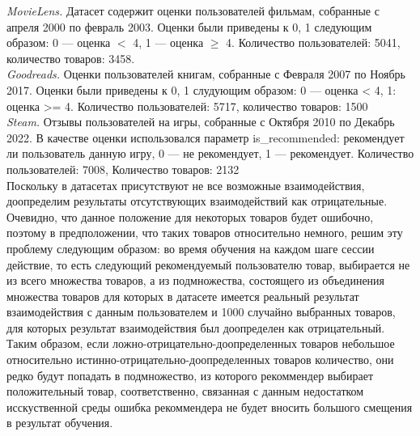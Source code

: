 \documentclass[a4paper,14pt,oneside]{mipt-thesis-ms}
\renewcommand{\geq}{\geqslant}  %
\begin{document}
{\it MovieLens\cite{movielens01}.} Датасет содержит оценки пользователей фильмам, собранные с апреля 2000 по февраль 2003. Оценки были приведены к {0, 1} следующим образом: 0 --- оценка $<$ 4, 1 --- оценка $\geq$ 4. Количество пользователей: 5041, количество товаров: 3458.\\

{\it Goodreads\cite{goodreads01}.} Оценки пользователей книгам, собранные с Февраля 2007 по
Ноябрь 2017. Оценки были приведены к {0, 1} слудующим образом: 0 --- оценка < 4, 1: оценка >= 4. Количество пользователей: 5717, количество товаров: 1500\\

{\it Steam\cite{steam01}.} Отзывы пользователей на игры, собранные с Октября 2010 по
Декабрь 2022. В качестве оценки использовался параметр is\_recommended: рекомендует ли пользователь данную игру, 0 --- не рекомендует, 1 --- рекомендует. Количество пользователей: 7008, Количество товаров: 2132\\

Поскольку в датасетах присутствуют не все возможные взаимодействия, доопределим результаты отсутствующих взаимодействий как отрицательные. Очевидно, что данное положение для некоторых товаров будет ошибочно, поэтому в предположении, что таких товаров относительно немного, решим эту проблему следующим образом: во время обучения на каждом шаге сессии действие, то есть следующий рекомендуемый пользователю товар, выбирается не из всего множества товаров, а из подмножества, состоящего из объединения множества товаров для которых в датасете имеется реальный результат взаимодействия с данным пользователем и 1000 случайно выбранных товаров, для которых результат взаимодействия был доопределен как отрицательный. Таким образом, если ложно-отрицательно-доопределенных товаров небольшое относительно истинно-отрицательно-доопределенных товаров количество, они редко будут попадать в подмножество, из которого рекоммендер выбирает положительный товар, соответственно, связанная с данным недостатком исскуственной среды ошибка рекоммендера не будет вносить большого смещения в результат обучения.\\
\end{document}
